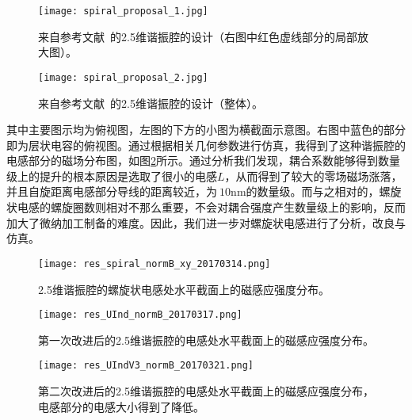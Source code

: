             \begin{figure}
                \begin{minipage}[b]{0.4\textwidth}
                    \centering
                    \texttt{[image: spiral\_proposal\_1.jpg]}
                    \caption{来自参考文献~的2.5维谐振腔的设计（右图中红色虚线部分的局部放大图）。}
                    \label{fig:spiral_proposal_1}
                \end{minipage}%
                \hfill
                \begin{minipage}[b]{0.5\textwidth}
                    \centering
                    \texttt{[image: spiral\_proposal\_2.jpg]}
                    \caption{来自参考文献~的2.5维谐振腔的设计（整体）。}
                    \label{fig:spiral_proposal_2}
                \end{minipage}
            \end{figure}
            其中主要图示均为俯视图，左图的下方的小图为横截面示意图。右图中蓝色的部分即为层状电容的俯视图。通过根据相关几何参数进行仿真，我得到了这种谐振腔的电感部分的磁场分布图，如图\ref{fig:res_spiral_normB_xy_20170314}所示。通过分析我们发现，耦合系数能够得到数量级上的提升的根本原因是选取了很小的电感$L$，从而得到了较大的零场磁场涨落，并且自旋距离电感部分导线的距离较近，为$~10$nm的数量级。而与之相对的，螺旋状电感的螺旋圈数则相对不那么重要，不会对耦合强度产生数量级上的影响，反而加大了微纳加工制备的难度。因此，我们进一步对螺旋状电感进行了分析，改良与仿真。

            \begin{figure}[h]
                \centering
                \texttt{[image: res\_spiral\_normB\_xy\_20170314.png]}
                \caption{2.5维谐振腔的螺旋状电感处水平截面上的磁感应强度分布。}
                \label{fig:res_spiral_normB_xy_20170314}
            \end{figure}

            \begin{figure}[h]
                \centering
                \texttt{[image: res\_UInd\_normB\_20170317.png]}
                \caption{第一次改进后的2.5维谐振腔的电感处水平截面上的磁感应强度分布。}
                \label{fig:res_UInd_normB_20170317}
            \end{figure}


            \begin{figure}[h]
                \centering
                \texttt{[image: res\_UIndV3\_normB\_20170321.png]}
                \caption{第二次改进后的2.5维谐振腔的电感处水平截面上的磁感应强度分布，电感部分的电感大小得到了降低。}
                \label{fig:res_UIndV3_normB_20170321}
            \end{figure}

